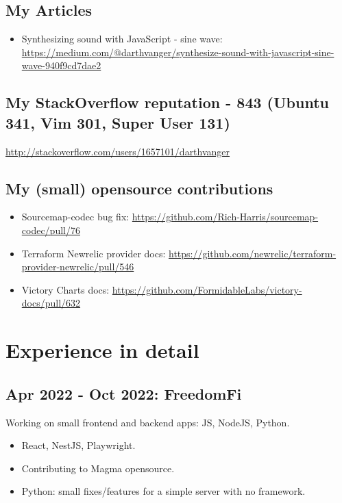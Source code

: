 \documentclass[a4paper, 14pt]{article}
\begin{document}
  \subsection{My Articles}
    \begin{itemize}
      \item Synthesizing sound with JavaScript - sine wave: \url{https://medium.com/@darthvanger/synthesize-sound-with-javascript-sine-wave-940f9cd7dae2}
    \end{itemize}

  \subsection{My StackOverflow reputation - 843 (Ubuntu 341, Vim 301, Super User 131)}
    \url{http://stackoverflow.com/users/1657101/darthvanger}

  \subsection{My (small) opensource contributions}
    \begin{itemize}
      \item Sourcemap-codec bug fix: \url{https://github.com/Rich-Harris/sourcemap-codec/pull/76} \\
      \item Terraform Newrelic provider docs: \url{https://github.com/newrelic/terraform-provider-newrelic/pull/546} \\
      \item Victory Charts docs: \url{https://github.com/FormidableLabs/victory-docs/pull/632}
    \end{itemize}

\section{Experience in detail}
  \subsection{Apr 2022 - Oct 2022: FreedomFi}
    Working on small frontend and backend apps: JS, NodeJS, Python.
    \begin{itemize}
      \item React, NestJS, Playwright. \\
      \item Contributing to Magma opensource. \\
      \item Python: small fixes/features for a simple server with no framework.
    \end{itemize}
\end{document}

